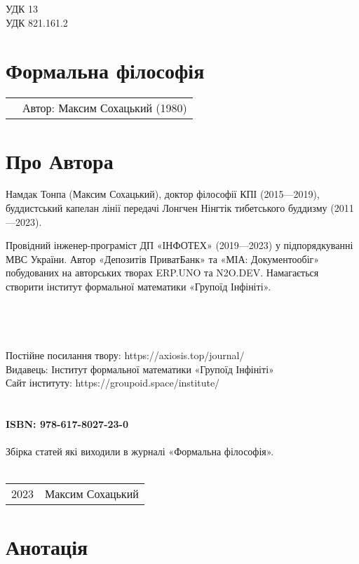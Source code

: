 \noindent УДК 13\\
УДК 821.161.2

\section*{Формальна філософія}

\begin{tabular}{ll}
& Автор: Максим Сохацький (1980)\\
\end{tabular}

\section*{Про Автора}
Намдак Тонпа (Максим Сохацький), доктор філософії КПІ (2015---2019),
буддистський капелан лінії передачі Лонгчен Нінгтік тибетського
буддизму (2011---2023).

Провідний інженер-програміст ДП «ІНФОТЕХ» (2019---2023)
у підпорядкуванні МВС України. Автор «Депозитів ПриватБанк» та «МІА: Документообіг» побудованих
на авторських творах ERP.UNO та N2O.DEV. Намагається створити
інститут формальної математики «Групоїд Інфініті».
\\
\\
\\
\\
\\
Постійне посилання твору: https://axiosis.top/journal/ \\
Видавець: Інститут формальної математики «Групоїд Інфініті» \\
Сайт інституту: https://groupoid.space/institute/ \\
\\
\\
{\bf ISBN: 978-617-8027-23-0 \hspace{2em}}
\\
\\
\small
\indent Збірка статей які виходили в журналі «Формальна філософія».
\\
\\
\begin{tabular}{ll}
\textcopyright{} 2023 & Максим Сохацький
\end{tabular}

\newpage
\section*{Анотація}

\normalsize

